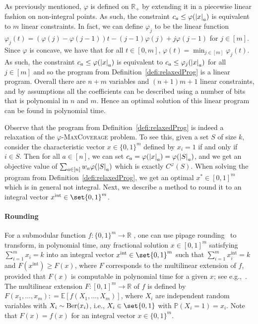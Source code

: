 As previously mentioned, $\varphi$ is defined on $\mathbb{R}_+$ by extending it in a piecewise linear fashion on non-integral points. As such, the constraint $c_a \leq \varphi(\abs{x}_a)$ is equivalent to $m$ linear constraints. In fact, we can define $\varphi_j$ to be the linear function $\varphi_j(t) = (\varphi(j) - \varphi(j-1)) t  - (j-1) \varphi(j) + j \varphi(j-1)$ for $j \in [m]$. Since $\varphi$ is concave, we have that for all $t \in [0, m]$, $\varphi(t) = \min_{j \in [m]} \varphi_j(t)$. As such, the constraint $c_a \leq \varphi(\abs{x}_a)$ is equivalent to $c_a \leq \varphi_j(\abs{x}_a)$ for all $j\in [m]$ and so the program from Definition~\ref{defi:relaxedProg} is a linear program. Overall there are $n+m$ variables and $(n+1)m + 1$ linear constraints, and by assumptions all the coefficients can be described using a number of bits that is polynomial in $n$ and $m$. Hence an optimal solution of this linear program can be found in polynomial time.

Observe that the program from Definition~\ref{defi:relaxedProg} is indeed a relaxation of the $\varphi$-\textsc{MaxCoverage} problem. To see this, given a set $S$ of size $k$, consider the characteristic vector $x \in \{0,1\}^m$ defined by $x_i = 1$ if and only if $i \in S$. Then for all $a \in [n]$, we can set $c_a = \varphi(\abs{x}_a) = \varphi(\abs{S}_a)$, and we get an objective value of $\sum_{a \in [n]}w_a\varphi(\abs{S}_a)$ which is exactly $C^{\varphi}(S)$. When solving the program from Definition~\ref{defi:relaxedProg}, we get an optimal $x^* \in [0,1]^m$ which is in general not integral. Next, we describe a method to round it to an integral vector $x^{\text{int}} \in \set{0,1}^m$.

\paragraph{Rounding} 
For a submodular function $f : \{0,1\}^m \to \mathbb{R}$ , one can use pipage rounding~\cite{AS04, Vondrak07, CCPV11} to transform, in polynomial time, any fractional solution $x \in [0,1]^m$ satisfying $\sum_{i=1}^m x_i = k$ into an integral vector $x^{\text{int}} \in \set{0,1}^m$ such that $\sum_{i=1}^m x^{\text{int}}_i = k$ and $F(x^{\text{int}}) \geq F(x)$, where $F$ corresponds to the multilinear extension of $f$, provided that $F(x)$ is computable in polynomial time for a given $x$; see e.g.,~\cite[Lemma 3.4]{Vondrak07}. The multilinear extension $F : [0, 1]^m \rightarrow \mathbb{R}$ of $f$ is defined by $F(x_1,\ldots,x_m): = \mathbb{E}[f(X_1,\ldots,X_m)]$, where $X_i$ are independent random variables with $X_i \sim \operatorname{\text{Ber}}(x_i)$, i.e., $X_i \in \set{0,1}$ with $\mathbb{P}(X_i = 1) = x_i$. Note that $F(x) = f(x)$ for an integral vector $x \in \{0,1\}^m$.

